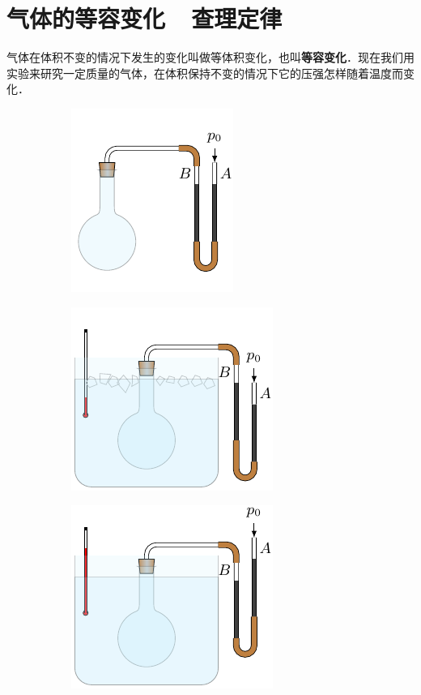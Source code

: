 \section{气体的等容变化~~查理定律}
气体在体积不变的情况下发生的变化叫做等体积变化，也叫\textbf{等容变化}．现在我们用实验来研究一定质量的气体，在体积保持不变的情况下它的压强怎样随着温度而变化．
\begin{figure}[htbp]
    \centering
    \begin{subfigure}{0.3\linewidth}
        \centering
        \includegraphics{fig/B/3-9a.pdf}
        \caption{}\label{fig_B_3-9a}
    \end{subfigure}
    \hfil
    \begin{subfigure}{0.3\linewidth}
        \centering
        \includegraphics{fig/B/3-9b.pdf}
        \caption{}\label{fig_B_3-9b}
    \end{subfigure}
    \hfil
    \begin{subfigure}{0.3\linewidth}
        \centering
        \includegraphics{fig/B/3-9c.pdf}
        \caption{}\label{fig_B_3-9c}
    \end{subfigure}
    \caption{}\label{fig_B_3-9}
\end{figure}

